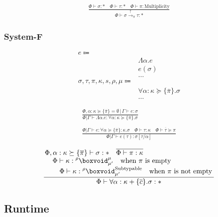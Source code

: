 \documentclass {article}
\begin{document}
\begin{gather*}
\frac
{\Phi \vdash \sigma : * \quad \Phi \vdash \tau : * \quad \Phi \vdash \pi : \text{Multiplicity}}
{\Phi \vdash \sigma \xrightarrow{\uparrow}_\pi \tau  : * }
\end{gather*}

\subsubsection{System-F}
\begin{align*}
e \Coloneqq & \\
& \Lambda \alpha. e \tag{Type Lambda} \\
& e (\sigma) \tag{Type Application} \\
& \dots \\
\sigma, \tau, \pi, \kappa, s, \rho, \mu \Coloneqq & \\
& \forall \alpha : \kappa \succeq \{ \overline \pi \}. \sigma \tag{Type Poly}\\ 
& \dots
\end{align*}

\begin{gather*}
\frac
{\Phi, \alpha : \kappa  \succeq \{ \overline \pi \} = \emptyset \, | \, \Gamma \vdash e : \sigma}
{\Phi | \Gamma \vdash \Lambda \alpha. e : \forall \alpha : \kappa \succeq \{ \overline \pi \} . \sigma } \\
\\
\frac
{\Phi | \Gamma \vdash e : \forall \alpha \succeq \{ \overline \pi \} : \kappa. \sigma \quad \Phi \vdash \tau : \kappa\quad \overline { \Phi \vdash \tau \succeq \pi }}
{\Phi | \Gamma \vdash e (\tau) : \sigma [\tau/\alpha] }
\end{gather*}

\begin{gather*}
\frac
{\splitfrac{\Phi, \alpha : \kappa \succeq \{ \overline \pi \}\vdash \sigma : * \quad \overline { \Phi \vdash \pi : \kappa}}
{\splitfrac{\Phi \vdash \kappa : \prescript {\rho} {} \boxvoid^\mu_{\mu'} \quad \text{when $ \pi $ is empty}}
{\Phi \vdash \kappa : \prescript {\rho} {} \boxvoid^{\text{Subtypable}}_{\mu'} \quad \text{when $ \pi $ is not empty} }}}
{\Phi \vdash \forall \alpha : \kappa + \{ \overline c \}. \sigma : * } \\
\end{gather*}

\subsection{Runtime}
\end{document}
